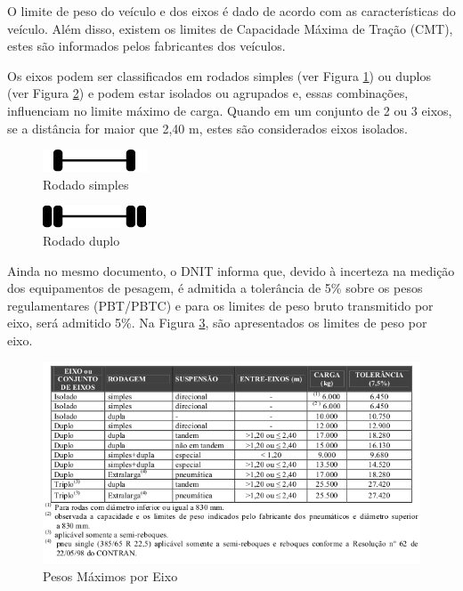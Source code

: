 \documentclass{ufscThesis}
\begin{document}
O limite de peso do veículo e dos eixos é dado de acordo com as características do veículo. Além disso, existem os limites de Capacidade Máxima de Tração (CMT), estes são informados pelos fabricantes dos veículos. 

Os eixos podem ser classificados em rodados simples (ver Figura \ref{fig:rodado-simples}) ou duplos (ver Figura \ref{fig:rodado-duplo}) e podem estar isolados ou agrupados e, essas combinações, influenciam no limite máximo de carga. Quando em um conjunto de 2 ou 3 eixos, se a distância for maior que 2,40 m, estes são considerados eixos isolados.

\begin{figure}[h!]
  \caption{Rodado simples}
  \label{fig:rodado-simples}
  \centering
    \includegraphics[scale=1]{./figuras/ejes_simples2.jpg}
\end{figure}


\begin{figure}[h!]
  \caption{Rodado duplo}
  \label{fig:rodado-duplo}
  \centering
    \includegraphics[scale=1]{./figuras/ejes_simples1.jpg}
\end{figure}

Ainda no mesmo documento, o DNIT informa que, devido à incerteza na medição dos equipamentos de pesagem, é admitida a tolerância de 5\% sobre os pesos regulamentares (PBT/PBTC) e para os limites de peso bruto transmitido por eixo, será admitido 5\%. Na Figura \ref{fig:peso-max-por-eixo}, são apresentados os limites de peso por eixo.

\begin{figure}[h!]
  \caption{Pesos Máximos por Eixo \cite{tech:dnit-qvf}}
  \label{fig:peso-max-por-eixo}
  \centering
    \includegraphics[scale=0.5]{./figuras/tabela-peso-por-eixo.png}
\end{figure}
\end{document}
